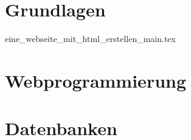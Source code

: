 
\part{Grundlagen}

{eine_webseite_mit_html_erstellen_main.tex}

\part{Webprogrammierung}

\part{Datenbanken}